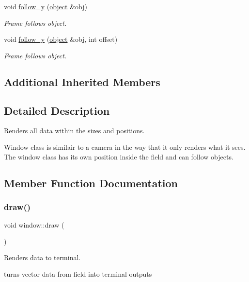 \begin{DoxyCompactItemize}
void \hyperlink{classwindow_a83a6b8a998e102def39d0c827d99b48e}{follow\+\_\+y} (\hyperlink{classobject}{object} \&obj)
\begin{DoxyCompactList}\small\item\em Frame follows object. \end{DoxyCompactList}\item 
void \hyperlink{classwindow_a64c6dd5f1f544282541532e17a26d1e7}{follow\+\_\+y} (\hyperlink{classobject}{object} \&obj, int offset)
\begin{DoxyCompactList}\small\item\em Frame follows object. \end{DoxyCompactList}\end{DoxyCompactItemize}
\subsection*{Additional Inherited Members}


\subsection{Detailed Description}
Renders all data within the sizes and positions. 

Window class is similair to a camera in the way that it only renders what it sees. The window class has it\textquotesingle{}s own position inside the field and can follow objects. 

\subsection{Member Function Documentation}
\mbox{\label{classwindow_aaa5781da14047b439cd587935633ee6d}} 
\subsubsection{\texorpdfstring{draw()}{draw()}\hspace{0.1cm}{\footnotesize\ttfamily [1/3]}}
{\footnotesize\ttfamily void window\+::draw (\begin{DoxyParamCaption}{ }\end{DoxyParamCaption})}



Renders data to terminal. 

turns vector data from field into terminal outputs \mbox{\label{classwindow_a405e7d2c0fcc62a7626c26e82b7a1ae4}} 
